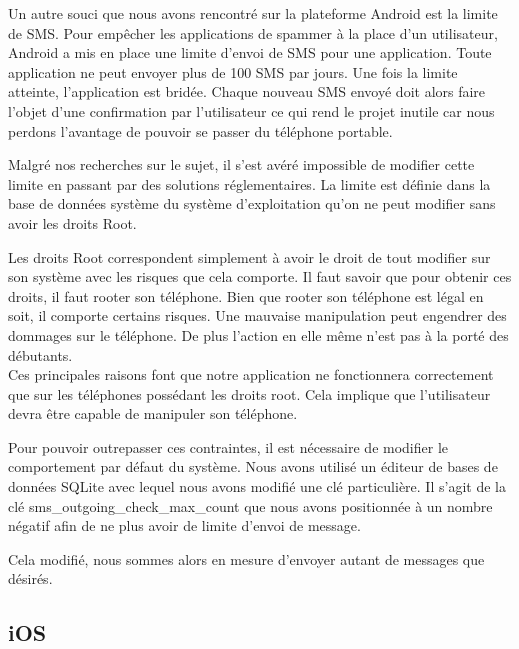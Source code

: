 Un autre souci que nous avons rencontré sur la plateforme Android est la limite de SMS. Pour empêcher
les applications de spammer à la place d'un utilisateur, Android a mis en place une limite d'envoi de 
SMS pour une application. Toute application ne peut envoyer plus de 100 SMS par jours. Une fois la limite
atteinte, l'application est bridée. Chaque nouveau SMS envoyé doit alors faire l'objet d'une confirmation
par l'utilisateur ce qui rend le projet inutile car nous perdons l'avantage de pouvoir se passer du 
téléphone portable.

Malgré nos recherches sur le sujet, il s'est avéré impossible de modifier cette limite en passant par
des solutions réglementaires. La limite est définie dans la base de données système du système d'exploitation
qu'on ne peut modifier sans avoir les droits Root.

Les droits Root correspondent simplement à avoir le droit de tout modifier sur son système avec les 
risques que cela comporte. Il faut savoir que pour obtenir ces droits, il faut rooter son téléphone.
Bien que rooter son téléphone est légal en soit, il comporte certains risques. Une mauvaise manipulation
peut engendrer des dommages sur le téléphone. De plus l'action en elle même n'est pas à la porté des 
débutants.
\\


Ces principales raisons font que notre application ne fonctionnera correctement que sur les téléphones
possédant les droits root. Cela implique que l'utilisateur devra être capable de manipuler son téléphone.

Pour pouvoir outrepasser ces contraintes, il est nécessaire de modifier le comportement par défaut du 
système. Nous avons utilisé un éditeur de bases de données SQLite avec lequel nous avons modifié une clé 
particulière. Il s'agit de la clé sms\_outgoing\_check\_max\_count que nous avons positionnée à un nombre négatif afin de ne plus avoir de limite d'envoi de message.

Cela modifié, nous sommes alors en mesure d'envoyer autant de messages que désirés. 




\subsection{iOS}

